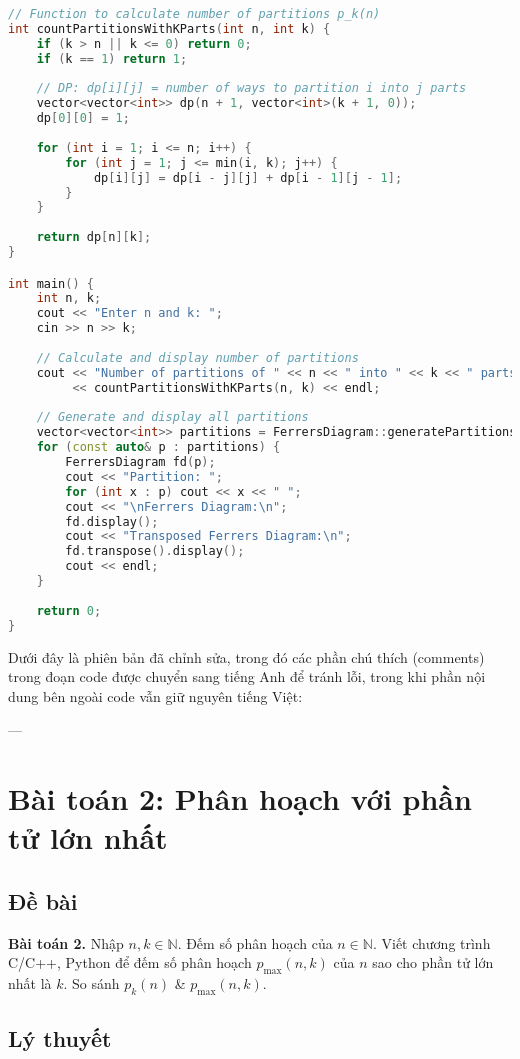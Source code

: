 \documentclass[12pt,a4paper]{article}
\theoremstyle{definition}
\begin{document}
\begin{lstlisting}[language=C++, caption=Complete C++ program]
// Function to calculate number of partitions p_k(n)
int countPartitionsWithKParts(int n, int k) {
    if (k > n || k <= 0) return 0;
    if (k == 1) return 1;
    
    // DP: dp[i][j] = number of ways to partition i into j parts
    vector<vector<int>> dp(n + 1, vector<int>(k + 1, 0));
    dp[0][0] = 1;
    
    for (int i = 1; i <= n; i++) {
        for (int j = 1; j <= min(i, k); j++) {
            dp[i][j] = dp[i - j][j] + dp[i - 1][j - 1];
        }
    }
    
    return dp[n][k];
}

int main() {
    int n, k;
    cout << "Enter n and k: ";
    cin >> n >> k;
    
    // Calculate and display number of partitions
    cout << "Number of partitions of " << n << " into " << k << " parts: " 
         << countPartitionsWithKParts(n, k) << endl;
    
    // Generate and display all partitions
    vector<vector<int>> partitions = FerrersDiagram::generatePartitions(n);
    for (const auto& p : partitions) {
        FerrersDiagram fd(p);
        cout << "Partition: ";
        for (int x : p) cout << x << " ";
        cout << "\nFerrers Diagram:\n";
        fd.display();
        cout << "Transposed Ferrers Diagram:\n";
        fd.transpose().display();
        cout << endl;
    }
    
    return 0;
}
\end{lstlisting}
Dưới đây là phiên bản đã chỉnh sửa, trong đó các phần chú thích (comments) trong đoạn code được chuyển sang tiếng Anh để tránh lỗi, trong khi phần nội dung bên ngoài code vẫn giữ nguyên tiếng Việt:

---

\section{Bài toán 2: Phân hoạch với phần tử lớn nhất}

\subsection{Đề bài}

\textbf{Bài toán 2.} Nhập $n, k \in \mathbb{N}$. Đếm số phân hoạch của $n \in \mathbb{N}$. Viết chương trình C/C++, Python để đếm số phân hoạch $p_{\max}(n, k)$ của $n$ sao cho phần tử lớn nhất là $k$. So sánh $p_k(n)$ \& $p_{\max}(n, k)$.

\subsection{Lý thuyết}
\end{document}

